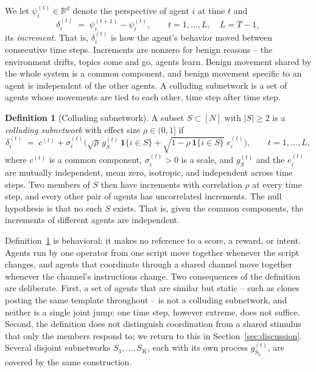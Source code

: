 \documentclass{article}
\theoremstyle{plain}
\theoremstyle{definition}
\newtheorem{definition}{Definition}
\newcommand{\R}{\mathbb{R}}
\newcommand{\N}{[N]}
\newcommand{\ind}{\mathbf{1}}
\begin{document}
We let $\psi_i^{(t)}\in\R^d$ denote the perspective of agent $i$ at time $t$ and
\begin{equation}
\delta_i^{(t)} \;=\; \psi_i^{(t+1)} - \psi_i^{(t)}, \qquad t=1,\dots,L,\quad L=T-1,
\end{equation}
its \emph{increment}. That is, $\delta_i^{(t)}$ is how the agent's behavior moved between consecutive time steps. Increments are nonzero for benign reasons -- the environment drifts, topics come and go, agents learn. Benign movement shared by the whole system is a common component, and benign movement specific to an agent is independent of the other agents. A colluding subnetwork is a set of agents whose movements are tied to each other, time step after time step.

\begin{definition}[Colluding subnetwork]
\label{def:collusion}
A subset $S\subset\N$ with $|S|\ge 2$ is a \emph{colluding subnetwork} with effect size $\rho\in(0,1]$ if
\begin{equation}
\label{eq:model}
\delta_i^{(t)} \;=\; c^{(t)} + \sigma_i^{(t)}\Big(\sqrt{\rho}\,g_S^{(t)}\,\ind\{i\in S\} + \sqrt{1-\rho\,\ind\{i\in S\}}\;e_i^{(t)}\Big), \qquad t=1,\dots,L,
\end{equation}
where $c^{(t)}$ is a common component, $\sigma_i^{(t)}>0$ is a scale, and $g_S^{(t)}$ and the $e_i^{(t)}$ are mutually independent, mean zero, isotropic, and independent across time steps. Two members of $S$ then have increments with correlation $\rho$ at every time step, and every other pair of agents has uncorrelated increments. The null hypothesis is that no such $S$ exists. That is, given the common components, the increments of different agents are independent.
\end{definition}

Definition~\ref{def:collusion} is behavioral: it makes no reference to a score, a reward, or intent. Agents run by one operator from one script move together whenever the script changes, and agents that coordinate through a shared channel move together whenever the channel's instructions change. Two consequences of the definition are deliberate. First, a set of agents that are similar but static -- such as clones posting the same template throughout -- is not a colluding subnetwork, and neither is a single joint jump: one time step, however extreme, does not suffice. Second, the definition does not distinguish coordination from a shared stimulus that only the members respond to; we return to this in Section~\ref{sec:discussion}. Several disjoint subnetworks $S_1,\dots,S_K$, each with its own process $g_{S_k}^{(t)}$, are covered by the same construction.
\end{document}
